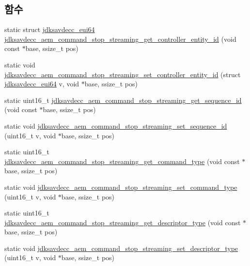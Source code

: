 \subsection*{함수}
\begin{DoxyCompactItemize}
\item 
static struct \hyperlink{structjdksavdecc__eui64}{jdksavdecc\+\_\+eui64} \hyperlink{group__command__stop__streaming_ga9990321b93daff2f0f7c869ab00d55b1}{jdksavdecc\+\_\+aem\+\_\+command\+\_\+stop\+\_\+streaming\+\_\+get\+\_\+controller\+\_\+entity\+\_\+id} (void const $\ast$base, ssize\+\_\+t pos)
\item 
static void \hyperlink{group__command__stop__streaming_ga3902d08fc3f5051eb1b55cee6ad4f8f2}{jdksavdecc\+\_\+aem\+\_\+command\+\_\+stop\+\_\+streaming\+\_\+set\+\_\+controller\+\_\+entity\+\_\+id} (struct \hyperlink{structjdksavdecc__eui64}{jdksavdecc\+\_\+eui64} v, void $\ast$base, ssize\+\_\+t pos)
\item 
static uint16\+\_\+t \hyperlink{group__command__stop__streaming_gad3e3143f7ef9129a9edb6f2f3cc5238e}{jdksavdecc\+\_\+aem\+\_\+command\+\_\+stop\+\_\+streaming\+\_\+get\+\_\+sequence\+\_\+id} (void const $\ast$base, ssize\+\_\+t pos)
\item 
static void \hyperlink{group__command__stop__streaming_ga53ce5cd4a823308288e69f8f54f2cd4a}{jdksavdecc\+\_\+aem\+\_\+command\+\_\+stop\+\_\+streaming\+\_\+set\+\_\+sequence\+\_\+id} (uint16\+\_\+t v, void $\ast$base, ssize\+\_\+t pos)
\item 
static uint16\+\_\+t \hyperlink{group__command__stop__streaming_ga5ddcebc9a8dd4c5b99dfa3563a84a07d}{jdksavdecc\+\_\+aem\+\_\+command\+\_\+stop\+\_\+streaming\+\_\+get\+\_\+command\+\_\+type} (void const $\ast$base, ssize\+\_\+t pos)
\item 
static void \hyperlink{group__command__stop__streaming_ga6a6d2c8dccfe9f17d47545d38dab07e5}{jdksavdecc\+\_\+aem\+\_\+command\+\_\+stop\+\_\+streaming\+\_\+set\+\_\+command\+\_\+type} (uint16\+\_\+t v, void $\ast$base, ssize\+\_\+t pos)
\item 
static uint16\+\_\+t \hyperlink{group__command__stop__streaming_gaea535098f01ddf172c770e22554deb34}{jdksavdecc\+\_\+aem\+\_\+command\+\_\+stop\+\_\+streaming\+\_\+get\+\_\+descriptor\+\_\+type} (void const $\ast$base, ssize\+\_\+t pos)
\item 
static void \hyperlink{group__command__stop__streaming_ga84efe9079c247fd79b63a4b1834dfeaa}{jdksavdecc\+\_\+aem\+\_\+command\+\_\+stop\+\_\+streaming\+\_\+set\+\_\+descriptor\+\_\+type} (uint16\+\_\+t v, void $\ast$base, ssize\+\_\+t pos)

\end{DoxyCompactItemize}
